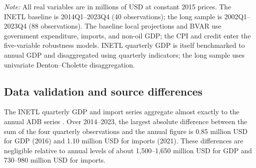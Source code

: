\documentclass[11pt,a4paper]{article}
\begin{document}
\begin{table}[htbp]
\centering
\small
\caption{Variables, sources, and samples}
\label{tab:variables}
\par\vspace{0.3em}
\begin{minipage}{0.95\textwidth}
\footnotesize\textit{Note:} All real variables are in millions of USD at constant 2015 prices. The INETL baseline is 2014Q1--2023Q4 (40 observations); the long sample is 2002Q1--2023Q4 (88 observations). The baseline local projections and BVAR use government expenditure, imports, and non-oil GDP; the CPI and credit enter the five-variable robustness models. INETL quarterly GDP is itself benchmarked to annual GDP and disaggregated using quarterly indicators; the long sample uses univariate Denton--Cholette disaggregation.
\end{minipage}
\end{table}

\subsection{Data validation and source differences}
\label{sec:validation}

The INETL quarterly GDP and import series aggregate almost exactly to the annual ADB series \parencite{adb2025}. Over 2014--2023, the largest absolute difference between the sum of the four quarterly observations and the annual figure is 0.85 million USD for GDP (2016) and 1.10 million USD for imports (2021). These differences are negligible relative to annual levels of about 1,500--1,650 million USD for GDP and 730--980 million USD for imports.
\end{document}
